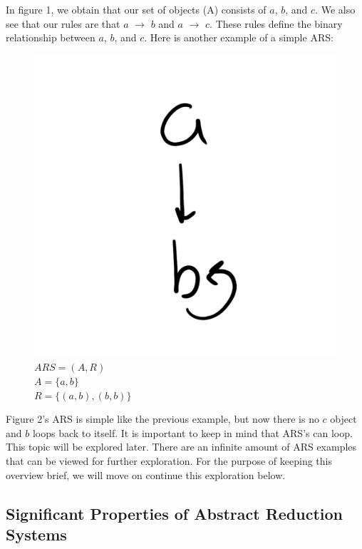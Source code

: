 \documentclass{article}
\begin{document}
\medskip\noindent
In figure 1, we obtain that our set of objects (A) consists of $a$, $b$, and $c$. We also see that our rules are that $a$ $\rightarrow$ $b$ and $a$ $\rightarrow$ $c$. These rules define the binary relationship between $a$, $b$, and $c$. Here is another example of a simple ARS:

\begin{figure}[h!]
  \centering
  \includegraphics[scale=0.06]{gen2}
  \caption[] {
    $ARS = (A, R)$
    \\ $A=\{a,b\}$
    \\ $R=\{(a,b),(b,b)\}$
    \endtabular}
\end{figure}

\medskip\noindent
Figure 2's ARS is simple like the previous example, but now there is no $c$ object and $b$ loops back to itself. It is important to keep in mind that ARS's can loop. This topic will be explored later. There are an infinite amount of ARS examples that can be viewed for further exploration. For the purpose of keeping this overview brief, we will move on continue this exploration below.

\subsection{Significant Properties of Abstract Reduction Systems}
\end{document}
